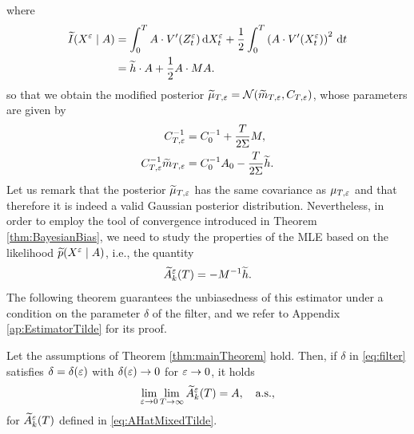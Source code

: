 \documentclass[10pt]{article}
\begin{document}
where 
\begin{equation}
\begin{aligned}
	\widetilde I(X^\varepsilon \mid A) & = \int_0^T A \cdot V'(Z^\varepsilon_t) \,\mathrm{d} X^\varepsilon_t + \frac12 \int_0^T \left(A \cdot V'(X^\varepsilon_t)\right)^2 \,\mathrm{d} t \\
	&= \widetilde h \cdot A + \frac12 A \cdot M A.
\end{aligned}
\end{equation}
so that we obtain the modified posterior $\widetilde \mu_{T,\varepsilon} = \mathcal N(\widetilde m_{T, \varepsilon}, C_{T, \varepsilon})$, whose parameters are given by
\begin{equation}
\begin{aligned}
	C_{T, \varepsilon}^{-1} &= C_0^{-1} + \frac{T}{2\Sigma} M, \\
	C_{T,\varepsilon}^{-1}\widetilde m_{T,\varepsilon} &= C_0^{-1}A_0 - \frac{T}{2\Sigma} \widetilde h. 
\end{aligned}	
\end{equation}
Let us remark that the posterior $\widetilde \mu_{T,\varepsilon}$ has the same covariance as $\mu_{T,\varepsilon}$ and that therefore it is indeed a valid Gaussian posterior distribution. Nevertheless, in order to employ the tool of convergence introduced in Theorem \ref{thm:BayesianBias}, we need to study the properties of the MLE based on the likelihood $\widetilde p(X^\varepsilon \mid A)$, i.e., the quantity
\begin{equation}\label{eq:AHatMixedTilde}
	\widetilde A^\varepsilon_k(T) = - M^{-1} \widetilde h.
\end{equation}
The following theorem guarantees the unbiasedness of this estimator under a condition on the parameter $\delta$ of the filter, and we refer to Appendix \ref{ap:EstimatorTilde} for its proof.
\begin{theorem}\label{thm:mainTheoremTilde} Let the assumptions of Theorem \ref{thm:mainTheorem} hold. Then, if $\delta$ in \eqref{eq:filter} satisfies $\delta = \delta(\varepsilon)$ with $\delta(\varepsilon) \to 0$ for $\varepsilon \to 0$, it holds
	\begin{equation}
	\lim_{\varepsilon \to 0} \lim_{T \to \infty} \widetilde A^\varepsilon_k(T) = A, \quad \text{a.s.},
	\end{equation} 
	for $\widetilde A^\varepsilon_k(T)$ defined in \eqref{eq:AHatMixedTilde}.
\end{theorem}
\end{document}
